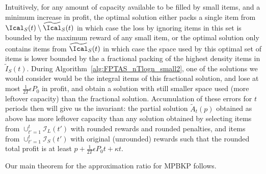 \documentclass[11pt]{article}
\begin{document}

Intuitively, for any amount of capacity available to be filled by small items, and a minimum increase in profit, the optimal solution either packs a single item from $\Ical_S(t) \setminus \widetilde{\Ical}_S(t)$ in which case the loss by ignoring items in this set is bounded by the maximum reward of any small item, or the optimal solution only contains items from $\widetilde{\Ical}_S(t)$ in which case the space used by this optimal set of items is lower bounded by the a fractional packing of the highest density items in  $\widetilde{I}_S(t)$. During Algorithm~\ref{alg:FPTAS_nTlogn_small2}, one of the solutions we would consider would be the integral items of this fractional solution, and lose at most $\frac{1}{2T}\epsilon P_0$ in profit, and obtain a solution with still smaller space used (more leftover capacity) than the fractional solution. Accumulation of these errors for $t$ periods then will give us the invariant: the partial solution $\widetilde{A}_t(p)$ obtained as above has more leftover capacity than any solution obtained by selecting items from $\cup_{t'=1}^t \mathcal{I}_L(t')$ with rounded rewards and rounded penalties, and items from $\cup_{t'=1}^t \mathcal{I}_S(t')$ with original (unrounded) rewards such that the rounded total profit is at least $p+\frac{1}{2T}\epsilon P_0t+\kappa t$.


Our main theorem for the approximation ratio for MPBKP follows.
\end{document}
